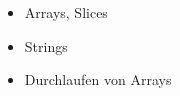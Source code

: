 \begin{frame}
    \begin{itemize}
        \item Arrays, Slices
        \item Strings
        \item Durchlaufen von Arrays
    \end{itemize}
\end{frame}